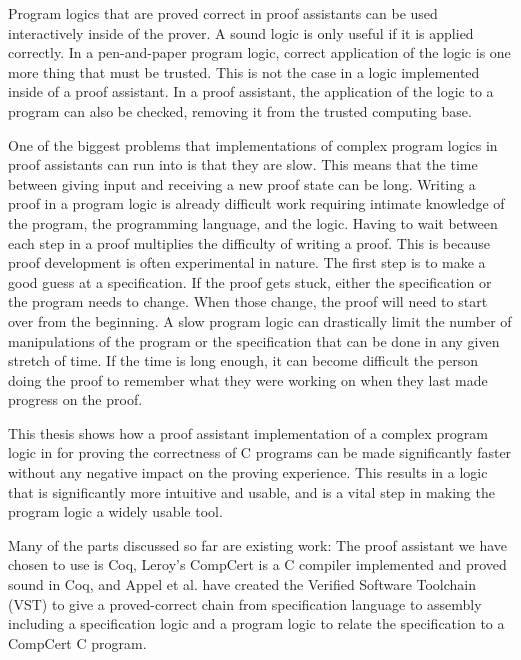 \documentclass{puthesis}
\begin{document}
Program logics that are proved correct in proof assistants can be used
interactively inside of the prover. A sound logic is only useful if it
is applied correctly. In a pen-and-paper program logic, correct
application of the logic is one more thing that must be trusted. This
is not the case in a logic implemented inside of a proof assistant. In
a proof assistant, the application of the logic to a program can also
be checked, removing it from the trusted computing base.

One of the biggest problems that implementations of complex program
logics in proof assistants can run into is that they are slow. This
means that the time between giving input and receiving a new proof
state can be long. Writing a proof in a program logic is already
difficult work requiring intimate knowledge of the program, the
programming language, and the logic. Having to wait between each step
in a proof multiplies the difficulty of writing a proof.  This is because proof
development is often experimental in nature. The first step is to make
a good guess at a specification. If the proof gets stuck, either the
specification or the program needs to change. When those change, the
proof will need to start over from the beginning. A slow program logic
can drastically limit the number of manipulations of the program or
the specification that can be done in any given stretch of time. If
the time is long enough, it can become difficult the person doing the
proof to remember what they were working on when they last made
progress on the proof.

This thesis shows how a proof assistant implementation of a complex
program logic in for proving the correctness of C programs can be made
significantly faster without any negative impact on the proving
experience. This results in a logic that is significantly more
intuitive and usable, and is a vital step in making the program logic
a widely usable tool.

Many of the parts discussed so far are existing work: The proof
assistant we have chosen to use is Coq, Leroy's CompCert
\cite{Leroy-Compcert-CACM} is a C compiler implemented and proved
sound in Coq, and Appel et al. \cite{appel14:plcc} have created the
Verified Software Toolchain (VST) to give a proved-correct chain from
specification language to assembly including a specification logic and
a program logic to relate the specification to a CompCert C program.
\end{document}

